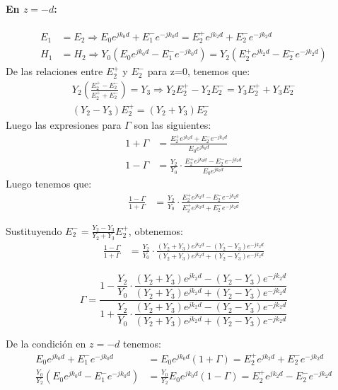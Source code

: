 \documentclass[
  11pt,
  letterpaper,
   addpoints,
   answers
  ]{exam}
\begin{document}
\begin{questions}
\begin{solution}
\begin{enumerate}
\paragraph{En \( z = -d \):}
\begin{align}
E_1 &= E_2 \Rightarrow E_0 e^{j k_0 d} + E_1^- e^{-j k_0 d} = E_2^+ e^{j k_2 d} + E_2^- e^{-j k_2 d} \\
H_1 &= H_2 \Rightarrow Y_0 (E_0 e^{j k_0 d} - E_1^- e^{-j k_0 d}) = Y_2 (E_2^+ e^{j k_2 d} - E_2^- e^{-j k_2 d})
\end{align}
De las relaciones entre \( E_2^+ \) y \( E_2^- \) para z=0, tenemos que:
\begin{align}
Y_2 \left( \frac{E_2^+ - E_2^-}{E_2^+ + E_2^-} \right) = Y_3
\Rightarrow Y_2 E_2^+ - Y_2 E_2^- = Y_3 E_2^+ + Y_3 E_2^- \\
(Y_2 - Y_3) E_2^+ = (Y_2 + Y_3) E_2^-
\end{align}
Luego las expresiones para \( \Gamma \) son las siguientes:
\begin{align}
1 + \Gamma &= \frac{E_2^+ e^{j k_2 d} + E_2^- e^{-j k_2 d}}{E_0 e^{j k_0 d}} \\
1 - \Gamma &= \frac{Y_2}{Y_0} \cdot \frac{E_2^+ e^{j k_2 d} - E_2^- e^{-j k_2 d}}{E_0 e^{j k_0 d}}
\end{align}
Luego tenemos que:
\begin{align}
\frac{1 - \Gamma}{1 + \Gamma} &= \frac{Y_2}{Y_0} \cdot \frac{E_2^+ e^{j k_2 d} - E_2^- e^{-j k_2 d}}{E_2^+ e^{j k_2 d} + E_2^- e^{-j k_2 d}}
\end{align}

Sustituyendo \( E_2^- = \frac{Y_2 - Y_3}{Y_2 + Y_3} E_2^+ \), obtenemos:
\begin{align}
\frac{1 - \Gamma}{1 + \Gamma} &= \frac{Y_2}{Y_0} \cdot \frac{(Y_2 + Y_3)e^{j k_2 d} - (Y_2 - Y_3)e^{-j k_2 d}}{(Y_2 + Y_3)e^{j k_2 d} + (Y_2 - Y_3)e^{-j k_2 d}}
\end{align}

\begin{equation}
\Gamma = \frac{1 - \dfrac{Y_2}{Y_0} \cdot \dfrac{(Y_2 + Y_3)e^{j k_2 d} - (Y_2 - Y_3)e^{-j k_2 d}}{(Y_2 + Y_3)e^{j k_2 d} + (Y_2 - Y_3)e^{-j k_2 d}}}
{1 + \dfrac{Y_2}{Y_0} \cdot \dfrac{(Y_2 + Y_3)e^{j k_2 d} - (Y_2 - Y_3)e^{-j k_2 d}}{(Y_2 + Y_3)e^{j k_2 d} + (Y_2 - Y_3)e^{-j k_2 d}}}
\end{equation}

De la condición en \( z = -d \) tenemos:
\begin{align}
E_0 e^{j k_0 d} + E_1^- e^{-j k_0 d} &= E_0 e^{j k_0 d}(1 + \Gamma) = E_2^+ e^{j k_2 d} + E_2^- e^{-j k_2 d} \\
\frac{Y_0}{Y_2} (E_0 e^{j k_0 d} - E_1^- e^{-j k_0 d}) &= \frac{Y_0}{Y_2} E_0 e^{j k_0 d} (1 - \Gamma) = E_2^+ e^{j k_2 d} - E_2^- e^{-j k_2 d}
\end{align}


\end{enumerate}
\end{solution}
\end{questions}
\end{document}
